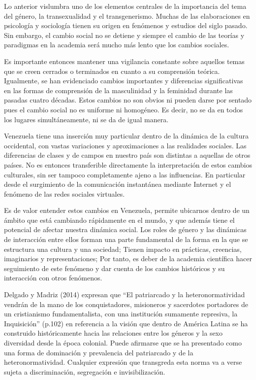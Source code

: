 Lo anterior vislumbra uno de los elementos centrales de la importancia del tema
del género, la transexualidad y el transgenerismo.
Muchas de las elaboraciones en psicología y sociología tienen su origen en
fenómenos y estudios del siglo pasado.
Sin embargo, el cambio social no se detiene y siempre el cambio de las teorías y
paradigmas en la academia será mucho más lento que los cambios sociales.

Es importante entonces mantener una vigilancia constante sobre aquellos temas
que se creen cerrados o terminados en cuanto a su comprensión teórica.
Igualmente, se han evidenciado cambios importantes y diferencias significativas
en las formas de comprensión de la masculinidad y la feminidad durante las
pasadas cuatro décadas.
Estos cambios no son obvios ni pueden darse por sentado pues el cambio social no
es uniforme ni homogéneo.
Es decir, no se da en todos los lugares simultáneamente, ni se da de igual
manera.

Venezuela tiene una inserción muy particular dentro de la dinámica de la cultura
occidental, con vastas variaciones y aproximaciones a las realidades sociales.
Las diferencias de clases y de campos en nuestro país son distintas a aquellas
de otros países.
No es entonces transferible directamente la interpretación de estos cambios
culturales, sin ser tampoco completamente ajeno a las influencias.
En particular desde el surgimiento de la comunicación instantánea mediante
Internet y el fenómeno de las redes sociales virtuales.

Es de valor entender estos cambios en Venezuela, permite ubicarnos dentro de un
ámbito que está cambiando rápidamente en el mundo, y que además tiene el
potencial de afectar nuestra dinámica social.
Los roles de género y las dinámicas de interacción entre ellos forman una parte
fundamental de la forma en la que se estructura una cultura y una sociedad;
Tienen impacto en prácticas, creencias, imaginarios y representaciones;
Por tanto, es deber de la academia científica hacer seguimiento de este
fenómeno y dar cuenta de los cambios históricos y su interacción con otros
fenómenos.

Delgado y Madriz (2014) expresan que “El patriarcado y la heteronormatividad
vendrán de la mano de los conquistadores, misioneros y sacerdotes portadores de
un cristianismo fundamentalista, con una institución sumamente represiva, la
Inquisición” (p.102) en referencia a la visión que dentro de América Latina se ha construido
históricamente hacia las relaciones entre los géneros y la sexo diversidad desde
la época colonial.
Puede afirmarse que se ha presentado como una forma de dominación y prevalencia
del patriarcado y de la heteronormatividad.
Cualquier expresión que transgreda esta norma va a verse sujeta a
discriminación, segregación e invisibilización.

